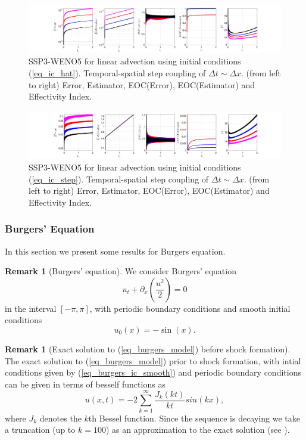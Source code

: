 \documentclass[12pt,a4paper]{article}
\numberwithin{equation}{section}
\theoremstyle{definition}
\newcommand{\qp}[1]{\left(#1\right)}
\newcommand{\qb}[1]{\left[#1\right]}
\newtheorem{Rem}[subsection]{Remark}
\begin{document}
\begin{figure}[H]
	\hspace{-3cm}
	\includegraphics[scale=0.55]{../figures/fig_SSP3WENO_hatIC_plots_1x5_linadvect}	
	\caption{SSP3-WENO5 for linear advection using initial conditions (\ref{eq_ic_hat}).  Temporal-spatial step coupling of $\Delta t\sim \Delta x$. (from left to right) Error, Estimator, EOC(Error), EOC(Estimator) and Effectivity Index.}
	\label{fig_SSP3WENO_hatIC_plots_1x5_linadvect}
\end{figure}
\begin{figure}[H]
	\hspace{-3cm}
	\includegraphics[scale=0.55]{../figures/fig_SSP3WENO_stepIC_plots_1x5_linadvect}	
	\caption{SSP3-WENO5 for linear advection  using initial conditions (\ref{eq_ic_step}).  Temporal-spatial step coupling of $\Delta t\sim \Delta x$. (from left to right) Error, Estimator, EOC(Error), EOC(Estimator) and Effectivity Index.}
	\label{fig_SSP3WENO_stepIC_plots_1x5_linadvect}
\end{figure}
\subsubsection{Burgers' Equation}
In this section we present some results for Burgers equation.
\begin{Rem}[Burgers' equation] We consider Burgers' equation
	\begin{equation}\label{eq_burgers_model}
u_t+\partial_x\qp{\frac{u^2}{2}}=0
\end{equation}
in the interval $\qb{-\pi, \pi}$, with periodic boundary conditions and smooth initial conditions
\begin{equation}\label{eq_burgers_ic_smooth}
u_0\qp{x}=-\sin \qp{x}.
\end{equation}
\end{Rem}
\begin{Rem}[Exact solution to (\ref{eq_burgers_model}) before shock formation]
The exact solution to (\ref{eq_burgers_model}) prior to shock formation, with intial conditions given by (\ref{eq_burgers_ic_smooth}) and periodic boundary conditions can be given in terms of besself functions as 
\begin{equation}
u\qp{x,t}= -2\sum_{k=1}^{\infty}\frac{J_k\qp{kt}}{kt}sin\qp{kx},
\end{equation}
where $J_k$ denotes the $k$th Bessel function.  Since the sequence is decaying we take a truncation (up to $k=100$) as an approximation to the exact solution (see \cite{giesselmann2015posteriori}).
\end{Rem}
\end{document}
